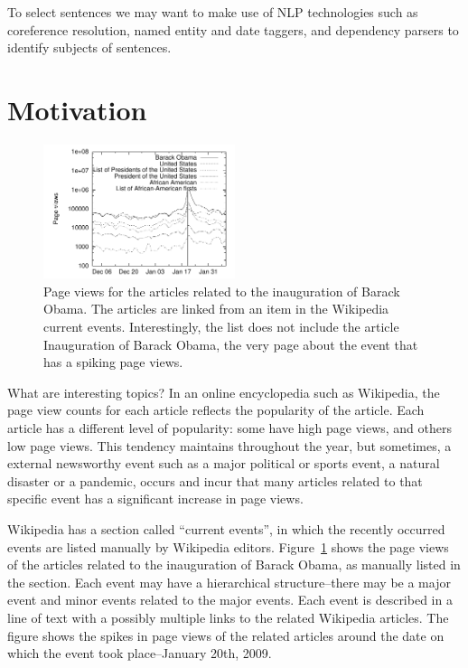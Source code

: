 \documentclass[11pt]{article}
\newcommand{\war}[1]{{\sf\small #1}}
\begin{document}
To select sentences we may want to make use of NLP technologies such as coreference resolution, named entity and date taggers, and dependency parsers to identify subjects of sentences.

\section{Motivation}

\begin{figure}
\centering
\includegraphics[width=0.5\textwidth]{figures/obama.pdf}
\caption{Page views for the articles related to the inauguration of Barack Obama. The articles are linked from an item in the Wikipedia current events. Interestingly, the list does not include the article \war{Inauguration of Barack Obama}, the very page about the event that has a spiking page views.}
\label{fig:obama-sparkline}
\end{figure}

What are interesting topics? In an online encyclopedia such as Wikipedia, the page view counts for each article reflects the popularity of the article. Each article has a different level of popularity: some have high page views, and others low page views. This tendency maintains throughout the year, but sometimes, a external newsworthy event such as a major political or sports event, a natural disaster or a pandemic, occurs and incur that many articles related to that specific event has a significant increase in page views.

Wikipedia has a section called ``current events'', in which the recently occurred events are listed manually by Wikipedia editors.
Figure~\ref{fig:obama-sparkline} shows the page views of the articles related to the inauguration of Barack Obama, as manually listed in the section.
Each event may have a hierarchical structure--there may be a major event and minor events related to the major events.
Each event is described in a line of text with a possibly multiple links to the related Wikipedia articles.
The figure shows the spikes in page views of the related articles around the date on which the event took place--January 20th, 2009.
\end{document}
